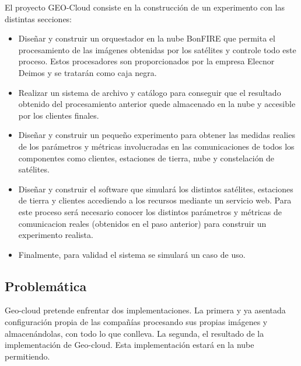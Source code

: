 El proyecto GEO-Cloud consiste en la construcción de un experimento con las distintas secciones:
\begin{itemize}
\item Diseñar y construir un orquestador en la nube BonFIRE que permita el procesamiento de las imágenes obtenidas por los satélites y controle todo este proceso. Estos procesadores son proporcionados por la empresa Elecnor Deimos y se tratarán como caja negra.
\item Realizar un sistema de archivo y catálogo para conseguir que el resultado obtenido del procesamiento anterior quede almacenado en la nube y accesible por los clientes finales.
\item Diseñar y construir un pequeño experimento para obtener las medidas realies de los parámetros y métricas involucradas en las comunicaciones de todos los componentes como clientes, estaciones de tierra, nube y constelación de satélites.
\item Diseñar y construir el software que simulará los distintos satélites, estaciones de tierra y clientes accediendo a los recursos mediante un servicio web. Para este proceso será necesario  conocer los distintos parámetros y métricas de comunicacion reales (obtenidos en el paso anterior)  para construir un experimento realista.
\item Finalmente, para validad el sistema se simulará un caso de uso.
\end{itemize}


\subsection{Problemática}
\label{sec:problematica}

Geo-cloud pretende enfrentar dos implementaciones. La primera y ya asentada configuración propia de las compañías procesando sus propias imágenes y almacenándolas, con todo lo que conlleva.
La segunda, el resultado de la implementación de Geo-cloud. Esta implementación estará en la nube permitiendo.










